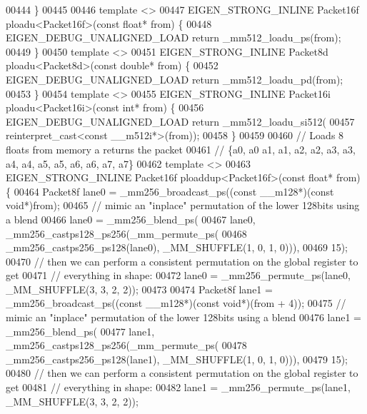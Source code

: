 \begin{DoxyCode}
00444 \}
00445 
00446 \textcolor{keyword}{template} <>
00447 EIGEN\_STRONG\_INLINE Packet16f ploadu<Packet16f>(\textcolor{keyword}{const} \textcolor{keywordtype}{float}* from) \{
00448   EIGEN\_DEBUG\_UNALIGNED\_LOAD \textcolor{keywordflow}{return} \_mm512\_loadu\_ps(from);
00449 \}
00450 \textcolor{keyword}{template} <>
00451 EIGEN\_STRONG\_INLINE Packet8d ploadu<Packet8d>(\textcolor{keyword}{const} \textcolor{keywordtype}{double}* from) \{
00452   EIGEN\_DEBUG\_UNALIGNED\_LOAD \textcolor{keywordflow}{return} \_mm512\_loadu\_pd(from);
00453 \}
00454 \textcolor{keyword}{template} <>
00455 EIGEN\_STRONG\_INLINE Packet16i ploadu<Packet16i>(\textcolor{keyword}{const} \textcolor{keywordtype}{int}* from) \{
00456   EIGEN\_DEBUG\_UNALIGNED\_LOAD \textcolor{keywordflow}{return} \_mm512\_loadu\_si512(
00457       reinterpret\_cast<const \_\_m512i*>(from));
00458 \}
00459 
00460 \textcolor{comment}{// Loads 8 floats from memory a returns the packet}
00461 \textcolor{comment}{// \{a0, a0  a1, a1, a2, a2, a3, a3, a4, a4, a5, a5, a6, a6, a7, a7\}}
00462 \textcolor{keyword}{template} <>
00463 EIGEN\_STRONG\_INLINE Packet16f ploaddup<Packet16f>(\textcolor{keyword}{const} \textcolor{keywordtype}{float}* from) \{
00464   Packet8f lane0 = \_mm256\_broadcast\_ps((\textcolor{keyword}{const} \_\_m128*)(\textcolor{keyword}{const} \textcolor{keywordtype}{void}*)from);
00465   \textcolor{comment}{// mimic an "inplace" permutation of the lower 128bits using a blend}
00466   lane0 = \_mm256\_blend\_ps(
00467       lane0, \_mm256\_castps128\_ps256(\_mm\_permute\_ps(
00468                  \_mm256\_castps256\_ps128(lane0), \_MM\_SHUFFLE(1, 0, 1, 0))),
00469       15);
00470   \textcolor{comment}{// then we can perform a consistent permutation on the global register to get}
00471   \textcolor{comment}{// everything in shape:}
00472   lane0 = \_mm256\_permute\_ps(lane0, \_MM\_SHUFFLE(3, 3, 2, 2));
00473 
00474   Packet8f lane1 = \_mm256\_broadcast\_ps((\textcolor{keyword}{const} \_\_m128*)(\textcolor{keyword}{const} \textcolor{keywordtype}{void}*)(from + 4));
00475   \textcolor{comment}{// mimic an "inplace" permutation of the lower 128bits using a blend}
00476   lane1 = \_mm256\_blend\_ps(
00477       lane1, \_mm256\_castps128\_ps256(\_mm\_permute\_ps(
00478                  \_mm256\_castps256\_ps128(lane1), \_MM\_SHUFFLE(1, 0, 1, 0))),
00479       15);
00480   \textcolor{comment}{// then we can perform a consistent permutation on the global register to get}
00481   \textcolor{comment}{// everything in shape:}
00482   lane1 = \_mm256\_permute\_ps(lane1, \_MM\_SHUFFLE(3, 3, 2, 2));

\end{DoxyCode}
